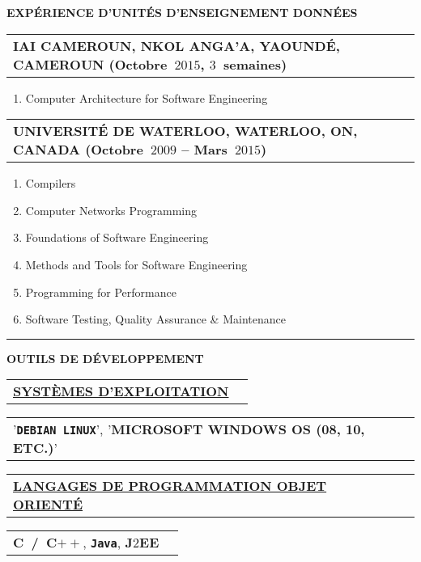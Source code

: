 \documentclass[9pt,a4paper]{article} %
\makeatletter
\newcommand{\headerrow}[2]
{\begin{tabular*}{\linewidth}{l@{\extracolsep{\fill}}r}
	#1 &
	#2 \\
\end{tabular*}}
\newcommand{\headerrowONE}[1]{\headerrow{#1}{}}
\newcommand{\cplusplus}{C$++$\xspace}
\newcommand{\java}{\texttt{Java}\xspace}
\newcommand{\jtwoee}{J$2$EE\xspace}
\newcommand{\yerothdebian}{\texttt{DEBIAN LINUX}\xspace}
\makeatother
\begin{document}
\begin{center}
{\large \textbf{EXPÉRIENCE D'UNITÉS D'ENSEIGNEMENT DONNÉES}}
\end{center}

\vspace{0.5em}

\headerrowONE{\textbf{IAI CAMEROUN, NKOL ANGA'A, YAOUNDÉ, CAMEROUN (Octobre~$2015$, $3$~semaines)}}
\begin{enumerate}
	\item Computer Architecture for Software Engineering
\end{enumerate}

\vspace{0.5em}

\headerrowONE{\textbf{UNIVERSITÉ DE WATERLOO, WATERLOO, ON, CANADA (Octobre~$2009$ -- Mars~$2015$)}}

\begin{enumerate}
	\itemsep -0.3em
	\item Compilers
	\item Computer Networks Programming
	\item Foundations of Software Engineering
	\item Methods and Tools for Software Engineering
	\item Programming for Performance
	\item Software Testing, Quality Assurance \& Maintenance
\end{enumerate}


\vspace{1em}

\hrule
\begin{center}
{\large \textbf{OUTILS DE DÉVELOPPEMENT}}
\end{center}

\vspace{0.5em}

\headerrowONE{\textbf{\underline{SYSTÈMES D'EXPLOITATION}}}
\headerrowONE{'\textbf{\yerothdebian}', '\textbf{MICROSOFT WINDOWS OS (08, 10, ETC.)}'}

\vspace{0.3em}

\headerrowONE{\textbf{\underline{LANGAGES DE PROGRAMMATION OBJET ORIENTÉ}}}
\headerrowONE{\textbf{C~/~\cplusplus}, \textbf{\java}, \textbf{\jtwoee}}

\vspace{0.3em}
\end{document}
